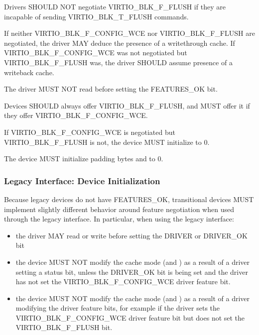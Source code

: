
Drivers SHOULD NOT negotiate VIRTIO_BLK_F_FLUSH if they are incapable of
sending VIRTIO_BLK_T_FLUSH commands.

If neither VIRTIO_BLK_F_CONFIG_WCE nor VIRTIO_BLK_F_FLUSH are
negotiated, the driver MAY deduce the presence of a writethrough cache.
If VIRTIO_BLK_F_CONFIG_WCE was not negotiated but VIRTIO_BLK_F_FLUSH was,
the driver SHOULD assume presence of a writeback cache.

The driver MUST NOT read  before setting
the FEATURES_OK  bit.


Devices SHOULD always offer VIRTIO_BLK_F_FLUSH, and MUST offer it
if they offer VIRTIO_BLK_F_CONFIG_WCE.

If VIRTIO_BLK_F_CONFIG_WCE is negotiated but VIRTIO_BLK_F_FLUSH
is not, the device MUST initialize  to 0.

The device MUST initialize padding bytes  and
 to 0.

\subsubsection{Legacy Interface: Device Initialization}\label{sec:Device Types / Block Device / Device Initialization / Legacy Interface: Device Initialization}

Because legacy devices do not have FEATURES_OK, transitional devices
MUST implement slightly different behavior around feature negotiation
when used through the legacy interface.  In particular, when using the
legacy interface:

\begin{itemize}
\item the driver MAY read or write  before setting
  the DRIVER or DRIVER_OK  bit

\item the device MUST NOT modify the cache mode (and )
  as a result of a driver setting a status bit, unless
  the DRIVER_OK bit is being set and the driver has not set the
  VIRTIO_BLK_F_CONFIG_WCE driver feature bit.

\item the device MUST NOT modify the cache mode (and )
  as a result of a driver modifying the driver feature bits, for example
  if the driver sets the VIRTIO_BLK_F_CONFIG_WCE driver feature bit but
  does not set the VIRTIO_BLK_F_FLUSH bit.
\end{itemize}


